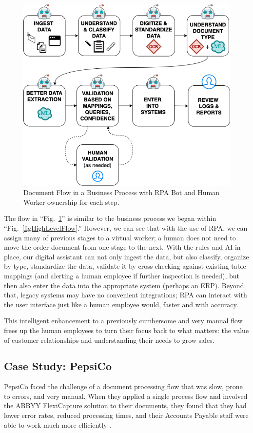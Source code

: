 \documentclass[conference]{IEEEtran}
\begin{document}
\begin{figure}[ht]
\centerline{\includegraphics[width=\columnwidth]{BotFlow.png}}
\caption{Document Flow in a Business Process with RPA Bot and Human Worker ownership for each step.}
\label{figBotFlow}
\end{figure}

The flow in ``Fig.~\ref{figBotFlow}'' is similar to the business process we began within ``Fig.~\ref{figHighLevelFlow}.'' However, we can see that with the use of RPA, we can assign many of previous stages to a virtual worker; a human does not need to move the order document from one stage to the next. With the rules and AI in place, our digital assistant can not only ingest the data, but also classify, organize by type, standardize the data, validate it by cross-checking against existing table mappings (and alerting a human employee if further inspection is needed), but then also enter the data into the appropriate system (perhaps an ERP). Beyond that, legacy systems may have no convenient integrations; RPA can interact with the user interface just like a human employee would, faster and with accuracy.

This intelligent enhancement to a previously cumbersome and very manual flow frees up the human employees to turn their focus back to what matters: the value of customer relationships and understanding their needs to grow sales.

\subsection{Case Study: PepsiCo}
PepsiCo faced the challenge of a document processing flow that was slow, prone to errors, and very manual. When they applied a single process flow and involved the ABBYY FlexiCapture solution to their documents, they found that they had lower error rates, reduced processing times, and their Accounts Payable staff were able to work much more efficiently \cite{pepsico}.
\end{document}
